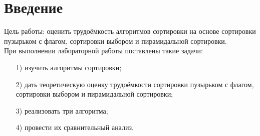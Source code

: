\chapter*{Введение}
\label{cha:intro}
Цель работы: оценить трудоёмкость алгоритмов сортировки на основе сортировки пузырьком с флагом, сортировки выбором и пирамидальной сортировки.\\
При выполнении лабораторной работы поставлены такие задачи:
\begin{enumerate}
	\item[1)] изучить алгоритмы сортировки;
	\item[2)] дать теоретическую оценку трудоёмкости сортировки пузырьком с флагом, сортировки выбором и пирамидальной сортировки;
	\item[3)] реализовать три алгоритма;
	\item[4)] провести их сравнительный анализ.
\end{enumerate}